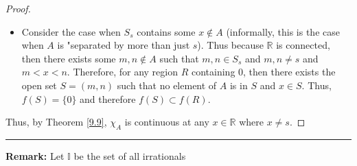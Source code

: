 \documentclass[openany, amssymb, psamsfonts]{amsart}
\newcommand{\bbI}{\mathbb{I}}
\newcommand{\bbR}{\mathbb{R}}
\theoremstyle{definition}
\numberwithin{equation}{section}
\begin{document}
\begin{enumerate}
\begin{proof}
\begin{itemize}
    \item Consider the case when $S_s$ contains some $x\notin A$ (informally, this is the case when $A$ is "separated by more than just $s$). Thus because $\bbR$ is connected, then there exists some $m,n\notin A$ such that $m,n \in S_s$ and $m,n \neq s$ and $m<x<n$. Therefore, for any region $R$ containing $0$, then there exists the open set $S = (m,n)$ such that no element of $A$ is in $S$ and $x\in S$. Thus, $f(S) = \{0\}$ and therefore $f(S) \subset f(R)$.
\end{itemize}
Thus, by Theorem \ref{9.9}, $\chi_A$ is continuous at any $x\in \bbR$ where $x\neq s$.
 \end{proof}\vspace{4pt}     \hrule   \vspace{4pt}
\end{enumerate}
\textbf{Remark:}
    Let $\bbI$ be the set of all irrationals
\end{document}
